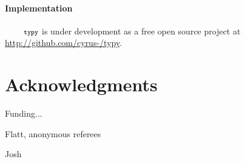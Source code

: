 \documentclass[10pt]{sigplanconf}
\newcommand{\typy}{\texttt{\footnotesize typy}}
\newcommand{\lip}[1]{\lstinline[language=Python,basicstyle=\ttfamily\footnotesize,morekeywords={with},deletendkeywords={tuple,buffer,map}]{#1}}
\begin{document}

\paragraph{Implementation}
$\typy$ is under development as a free open source project at 
\url{http://github.com/cyrus-/typy}.

\section*{Acknowledgments}
Funding... 

Flatt, anonymous referees

Josh






\end{document}
